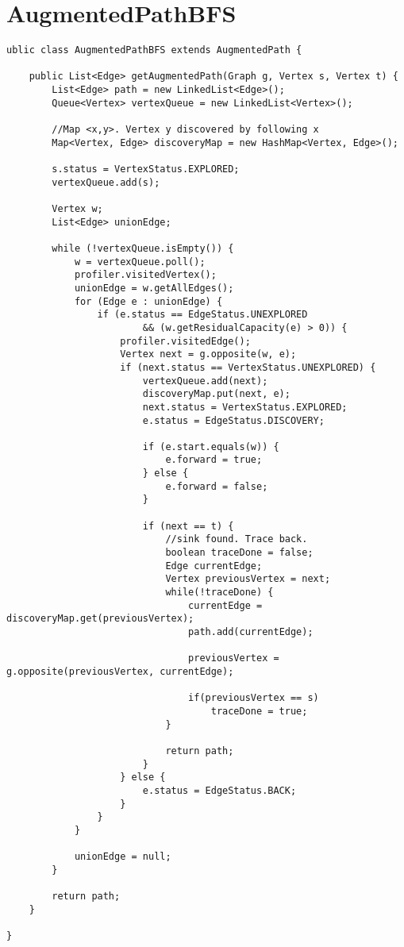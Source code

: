\chapter{AugmentedPathBFS}
\lstset{language=Java}
\begin{lstlisting}[caption=AugmentedPathBFS Source Code]
ublic class AugmentedPathBFS extends AugmentedPath {

	public List<Edge> getAugmentedPath(Graph g, Vertex s, Vertex t) {
		List<Edge> path = new LinkedList<Edge>();
		Queue<Vertex> vertexQueue = new LinkedList<Vertex>();
		
		//Map <x,y>. Vertex y discovered by following x
		Map<Vertex, Edge> discoveryMap = new HashMap<Vertex, Edge>(); 

		s.status = VertexStatus.EXPLORED;
		vertexQueue.add(s);

		Vertex w;
		List<Edge> unionEdge;

		while (!vertexQueue.isEmpty()) {
			w = vertexQueue.poll();
			profiler.visitedVertex();
			unionEdge = w.getAllEdges();
			for (Edge e : unionEdge) {
				if (e.status == EdgeStatus.UNEXPLORED
						&& (w.getResidualCapacity(e) > 0)) {
					profiler.visitedEdge();
					Vertex next = g.opposite(w, e);
					if (next.status == VertexStatus.UNEXPLORED) {
						vertexQueue.add(next);
						discoveryMap.put(next, e);
						next.status = VertexStatus.EXPLORED;
						e.status = EdgeStatus.DISCOVERY;
						
						if (e.start.equals(w)) {
							e.forward = true;
						} else {
							e.forward = false;
						}
						
						if (next == t) {
							//sink found. Trace back.
							boolean traceDone = false;
							Edge currentEdge;
							Vertex previousVertex = next;
							while(!traceDone) {
								currentEdge = discoveryMap.get(previousVertex);
								path.add(currentEdge);
								
								previousVertex = g.opposite(previousVertex, currentEdge);
								
								if(previousVertex == s)
									traceDone = true;
							}
							
							return path;
						}
					} else {
						e.status = EdgeStatus.BACK;
					}
				}
			}

			unionEdge = null;
		}

		return path;
	}
	
}
\end{lstlisting}
